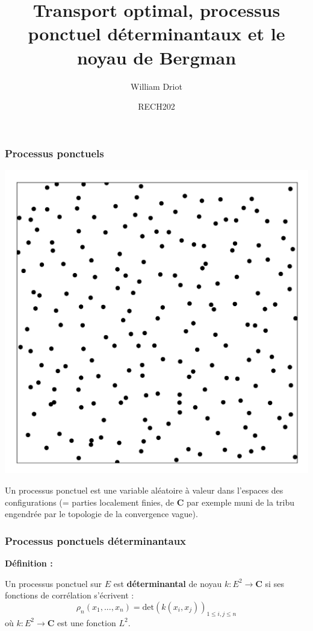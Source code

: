 \documentclass[9pt]{beamer}
\title{Transport optimal, processus ponctuel déterminantaux et le noyau de Bergman}
\date{RECH202}
\author{William Driot}
\begin{document}
\begin{frame}

\titlepage

\end{frame}\begin{frame}\frametitle{Processus ponctuels}

    \begin{center}

    \includegraphics[scale=1]{Points trimmed.jpg}

    
    Un processus ponctuel est une variable aléatoire à valeur dans l'espaces des \og configurations \fg (= parties localement finies, de $ \mathbf C $ par exemple muni de la tribu engendrée par le topologie de la convergence vague).
    \end{center}

\end{frame}\begin{frame}\frametitle{Processus ponctuels déterminantaux}

    \textbf{Définition :}

    Un processus ponctuel sur $E$ est \textbf{déterminantal} de noyau $k : E^2 \to \mathbf C$ si ses fonctions de corrélation s'écrivent :
    \[
        \rho_n(x_1,...,x_n) = \mathrm{det}(k(x_i,x_j))_{1 \leqslant i,j \leqslant n}
    \]
    où $ k : E^2 \to \mathbf C $ est une fonction $L^2$.


\end{frame}
\end{document}
